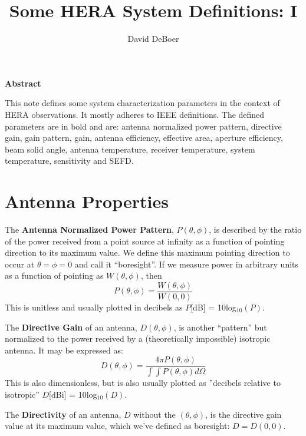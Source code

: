 \documentclass[11pt]{article}
\begin{document}
\title{Some HERA System Definitions: I}
\author{David DeBoer}
\maketitle

\begin{center}
{\bf Abstract}
\end{center}

\small
\begin{adjustwidth}{1in}{1in}
This note defines some system characterization parameters in the context of HERA observations.  It mostly adheres to IEEE definitions.  The defined parameters are in bold and are: antenna normalized power pattern, directive gain, gain pattern, gain, antenna efficiency, effective area, aperture efficiency, beam solid angle, antenna temperature, receiver temperature, system temperature, sensitivity and SEFD.
\end{adjustwidth}

\section{Antenna Properties}
The {\bf Antenna Normalized Power Pattern}, $P(\theta,\phi)$, is described by the ratio of the power received from a point source at infinity as a function of pointing direction to its maximum value.  We define this maximum pointing direction to occur at $\theta = \phi = 0$ and call it ``boresight''.  If we measure power in arbitrary units as a function of pointing as $W(\theta,\phi)$, then
\begin{equation}
P(\theta,\phi) = \frac{W(\theta,\phi)}{W(0,0)}
\end{equation}
This is unitless and usually plotted in decibels as $P$[dB] = 10log$_{10}(P)$.

The {\bf Directive Gain} of an antenna, $D(\theta,\phi)$, is another ``pattern'' but normalized to the power received by a (theoretically impossible) isotropic antenna.  It may be expressed as:
\begin{equation}
D(\theta,\phi) = \frac{4\pi P(\theta,\phi)}{\int\int P(\theta,\phi)d\Omega}
\end{equation} 
This is also dimensionless, but is also usually plotted as ''decibels relative to isotropic'' $D$[dBi] = 10log$_{10}(D)$.

The {\bf Directivity} of an antenna, $D$ without the $(\theta,\phi)$, is the directive gain value at its maximum value, which we've defined as boresight:  $D = D(0,0)$.
\end{document}
